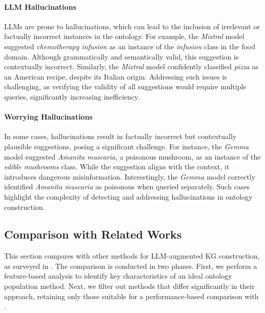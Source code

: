\paragraph{\Gls{LLM} Hallucinations}
%
\glspl{LLM} are prone to hallucinations, which can lead to the inclusion of irrelevant or factually incorrect instances in the ontology.
%
For example, the \emph{Mistral} model suggested \emph{chemotherapy infusion} as an instance of the \emph{infusion} class in the food domain.
%
Although grammatically and semantically valid, this suggestion is contextually incorrect.
%
Similarly, the \emph{Mixtral} model confidently classified \emph{pizza} as an American recipe, despite its Italian origin.
%
Addressing such issues is challenging, as verifying the validity of all suggestions would require multiple queries, significantly increasing inefficiency.

\paragraph{Worrying Hallucinations}
%
In some cases, hallucinations result in factually incorrect but contextually plausible suggestions, posing a significant challenge.
%
For instance, the \emph{Gemma} model suggested \emph{Amanita muscaria}, a poisonous mushroom, as an instance of the \emph{edible mushrooms} class.
%
While the suggestion aligns with the context, it introduces dangerous misinformation.
%
Interestingly, the \emph{Gemma} model correctly identified \emph{Amanita muscaria} as poisonous when queried separately.
%
Such cases highlight the complexity of detecting and addressing hallucinations in ontology construction.


\subsection{Comparison with Related Works}
\label{subsec:comparison}
%
This section compares \llmfkg{} with other methods for \gls{LLM}-augmented \gls{KG} construction, as surveyed in .
%
The comparison is conducted in two phases.
%
First, we perform a feature-based analysis to identify key characteristics of an ideal ontology population method.
%
Next, we filter out methods that differ significantly in their approach, retaining only those suitable for a performance-based comparison with \llmfkg{}.


